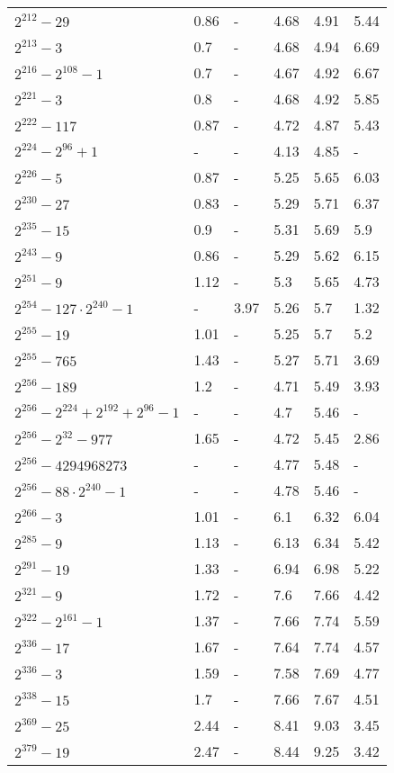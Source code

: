 \documentclass[conference,letterpaper]{IEEEtran}
\begin{document}
\begin{xtabular}{|l|p{0.6cm}@{}|p{0.75cm}@{}|p{0.75cm}@{}|p{0.7cm}@{}|p{0.75cm}@{}|}
	$2^{212}-29$ & 0.86 & - & 4.68 & 4.91 & 5.44 \\
	$2^{213}-3$ & 0.7 & - & 4.68 & 4.94 & 6.69 \\
	$2^{216}-2^{108}-1$ & 0.7 & - & 4.67 & 4.92 & 6.67 \\
	$2^{221}-3$ & 0.8 & - & 4.68 & 4.92 & 5.85 \\
	$2^{222}-117$ & 0.87 & - & 4.72 & 4.87 & 5.43 \\
	$2^{224}-2^{96}+1$ & - & - & 4.13 & 4.85 & - \\
	$2^{226}-5$ & 0.87 & - & 5.25 & 5.65 & 6.03 \\
	$2^{230}-27$ & 0.83 & - & 5.29 & 5.71 & 6.37 \\
	$2^{235}-15$ & 0.9 & - & 5.31 & 5.69 & 5.9 \\
	$2^{243}-9$ & 0.86 & - & 5.29 & 5.62 & 6.15 \\
	$2^{251}-9$ & 1.12 & - & 5.3 & 5.65 & 4.73 \\
	$2^{254}-127\cdot 2^{240}-1$ & - & 3.97 & 5.26 & 5.7 & 1.32 \\
	$2^{255}-19$ & 1.01 & - & 5.25 & 5.7 & 5.2 \\
	$2^{255}-765$ & 1.43 & - & 5.27 & 5.71 & 3.69 \\
	$2^{256}-189$ & 1.2 & - & 4.71 & 5.49 & 3.93 \\
	$2^{256}-2^{224}+2^{192}+2^{96}-1$ & - & - & 4.7 & 5.46 & - \\
	$2^{256}-2^{32}-977$ & 1.65 & - & 4.72 & 5.45 & 2.86 \\
	$2^{256}-4294968273$ & - & - & 4.77 & 5.48 & - \\
	$2^{256}-88\cdot 2^{240}-1$ & - & - & 4.78 & 5.46 & - \\
	$2^{266}-3$ & 1.01 & - & 6.1 & 6.32 & 6.04 \\
	$2^{285}-9$ & 1.13 & - & 6.13 & 6.34 & 5.42 \\
	$2^{291}-19$ & 1.33 & - & 6.94 & 6.98 & 5.22 \\
	$2^{321}-9$ & 1.72 & - & 7.6 & 7.66 & 4.42 \\
	$2^{322}-2^{161}-1$ & 1.37 & - & 7.66 & 7.74 & 5.59 \\
	$2^{336}-17$ & 1.67 & - & 7.64 & 7.74 & 4.57 \\
	$2^{336}-3$ & 1.59 & - & 7.58 & 7.69 & 4.77 \\
	$2^{338}-15$ & 1.7 & - & 7.66 & 7.67 & 4.51 \\
	$2^{369}-25$ & 2.44 & - & 8.41 & 9.03 & 3.45 \\
	$2^{379}-19$ & 2.47 & - & 8.44 & 9.25 & 3.42 \\

\end{xtabular}
\end{document}
